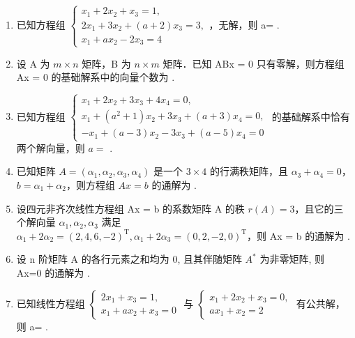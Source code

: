 \documentclass[12pt, a4paper]{ctexart}
\begin{document}
\begin{enumerate}[start=7]
    \item 已知方程组 $ \begin{cases} x_{1} + 2x_{2} + x_{3} = 1, \\ 2x_{1} + 3x_{2} + (a + 2)x_{3} = 3, \\ x_{1} + ax_{2} - 2x_{3} = 4 \end{cases} $，无解，则 a= \underline{\hspace{2cm}}.

    \item 设 A 为 $ m \times n $ 矩阵，B 为 $ n \times m $ 矩阵．已知 ABx = 0 只有零解，则方程组 Ax = 0 的基础解系中的向量个数为 \underline{\hspace{2cm}}.

    \item 已知方程组 $ \begin{cases} x_1 + 2x_2 + 3x_3 + 4x_4 = 0, \\ x_1 + (a^2 + 1)x_2 + 3x_3 + (a + 3)x_4 = 0, \\ -x_1 + (a - 3)x_2 - 3x_3 + (a - 5)x_4 = 0 \end{cases} $ 的基础解系中恰有两个解向量，则 $ a = $ \underline{\hspace{2cm}}.

    \item 已知矩阵 $ A = (\alpha_1, \alpha_2, \alpha_3, \alpha_4) $ 是一个 $ 3 \times 4 $ 的行满秩矩阵，且 $ \alpha_3 + \alpha_4 = 0 $， $ b = \alpha_1 + \alpha_2 $，则方程组 $ Ax = b $ 的通解为 \underline{\hspace{2cm}}.

    \item 设四元非齐次线性方程组 Ax = b 的系数矩阵 A 的秩 $ r(A) = 3 $，且它的三个解向量 $ \alpha_{1}, \alpha_{2}, \alpha_{3} $ 满足 $ \alpha_{1} + 2\alpha_{2} = (2, 4, 6, -2)^{\mathrm{T}}, \alpha_{1} + 2\alpha_{3} = (0, 2, -2, 0)^{\mathrm{T}} $，则 Ax = b 的通解为 \underline{\hspace{2cm}}.

    \item 设 n 阶矩阵 A 的各行元素之和均为 0, 且其伴随矩阵 $ A^{*} $ 为非零矩阵, 则 Ax=0 的通解为 \underline{\hspace{2cm}}.

    \item 已知线性方程组 $ \begin{cases}2x_{1}+x_{3}=1,\\x_{1}+ax_{2}+x_{3}=0\end{cases} $ 与 $ \begin{cases}x_{1}+2x_{2}+x_{3}=0,\\ax_{1}+x_{2}=2\end{cases} $ 有公共解，则 a= \underline{\hspace{2cm}}.
\end{enumerate}
\end{document}

